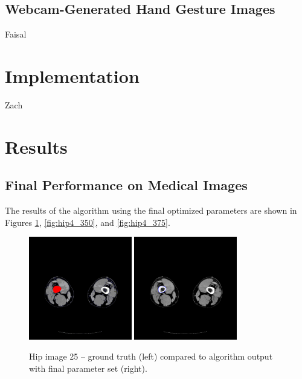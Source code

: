 \documentclass{article}
\begin{document}
		\subsection{Webcam-Generated Hand Gesture Images}
			Faisal

	\section{Implementation}
		Zach

	\section{Results}
		
		\subsection{Final Performance on Medical Images}
		The results of the algorithm using the final optimized parameters are shown in Figures \ref{fig:hip4_25}, \ref{fig:hip4_350}, and \ref{fig:hip4_375}. 
		\begin{figure}[H]
			\centering
			\includegraphics[width=0.4\textwidth]{Hip4/groundTruth25col.png}
			\hspace{20pt}
			\includegraphics[width=0.4\textwidth]{Hip4/output25.png}
			\caption{Hip image 25 -- ground truth (left) compared to algorithm output with final parameter set (right).}
			\label{fig:hip4_25}
		\end{figure}
\end{document}
